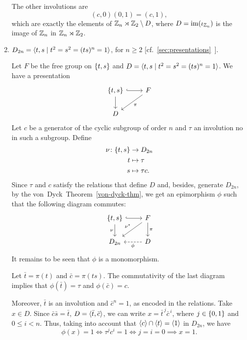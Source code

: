 \begin{xmpl}
\begin{enumerate}[\rm a)]
        The other involutions are
        $$
            (c,0)(0,1) = (c,1),
        $$
        which are exactly the elements of $\mathbb{Z}_n\rtimes\mathbb{Z}_2\setminus D$, where $D=\operatorname{im}(\iota_{\mathbb{Z}_n})$ is the image of $\mathbb{Z}_n$ in $\mathbb{Z}_n\rtimes\mathbb{Z}_2$.
        
        \item $D_{2n}=\langle t,s\mid t^2=s^2= (ts)^n = 1\rangle$, for $n\ge2$ [cf.~\ref{sec:presentations}~].

        Let $F$ be the free group on $\{t,s\}$ and $D=\langle t,s\mid t^2=s^2= (ts)^n = 1\rangle$. We have a presentation
        $$
            \begin{tikzcd}
                \set{t,s}
                        \arrow[d]
                        \arrow[r,hook]
                    &F
                        \arrow[ld,"\pi"]\\
                D
            \end{tikzcd}
        $$
        Let $c$ be a generator of the cyclic subgroup of order $n$ and $\tau$ an involution no in such a subgroup. Define
        \begin{align*}
            \nu\colon\{t,s\}&\to D_{2n}\\
            t&\mapsto\tau\\
            s&\mapsto\tau c.
        \end{align*}
        Since $\tau$ and $c$ satisfy the relations that define $D$ and, besides, generate $D_{2n}$, by the von~Dyck~Theorem~\ref{von-dyck-thm}, we get an epimorphism $\phi$ such that the following diagram commutes:
        $$
            \begin{tikzcd}
                {\set{t,s}}
                        \arrow[r,hook]
                        \arrow[d,"\nu"']
                    &F
                        \arrow[d,"\pi"]
                        \arrow[ld,"\nu^*"']\\
                D_{2n}
                    &D
                        \arrow[l,"\phi",dashed]
            \end{tikzcd}
        $$
        It remains to be seen that $\phi$ is a monomorphism.

        Let $\bar t=\pi(t)$ and $\bar c=\pi(ts)$. The commutativity of the last diagram implies that $\phi(\bar t)=\tau$ and $\phi(\bar c)=c$.
        
        Moreover, $\bar t$ is an involution and $\bar c^n=1$, as encoded in the relations. Take $x\in D$. Since $\bar c\bar s=\bar t$, $D=\langle\bar t,\bar c\rangle$, we can write $x=\bar t^{\,j}\bar c^{\,i}$, where $j\in\{0,1\}$ and $0\le i<n$. Thus, taking into account that $\langle c\rangle\cap\langle t\rangle=\langle1\rangle$ in $D_{2n}$, we have
        $$
            \phi(x)=1 \iff \tau^j c^i=1
                \iff j=i=0 \implies x=1.
        $$
    \end{enumerate}
\end{xmpl}

